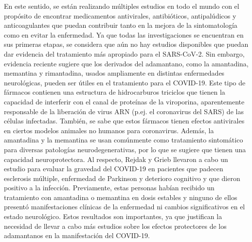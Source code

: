 \documentclass[12 pt]{article}
\begin{document}
En este sentido, se están realizando múltiples estudios en todo el mundo con el propósito de encontrar medicamentos antivirales, antibióticos, antipalúdicos y anticoagulantes que puedan contribuir tanto en la mejora de la sintomatología como en evitar la enfermedad. Ya que todas las investigaciones se encuentran en sus primeras etapas, se considera que aún no hay estudios disponibles que puedan dar evidencia del tratamiento más apropiado para el SARS-CoV-2. Sin embargo, evidencia reciente sugiere que los derivados del adamantano, como la amantadina, memantina y rimantadina, usados ampliamente en distintas enfermedades neurológicas, pueden ser útiles en el tratamiento para el COVID-19\citep{borra2020does}. Este tipo de fármacos contienen una estructura de hidrocarburos triciclos que tienen la capacidad de interferir con el canal de proteínas de la viroporina, aparentemente responsable de la liberación de virus ARN (p.ej. el coronavirus del SARS) de las células infectadas\citep{torres2007conductance}. También, se sabe que estos fármacos tienen efectos antivirales en ciertos modelos animales no humanos para coronavirus\citep{cimolai2020potentially}.  Además, la amantadina y la memantina se usan comúnmente como tratamiento sintomático para diversas patologías neurodegenerativas, por lo que se sugiere que tienen una capacidad neuroprotectora\citep{tipton2020response}. Al respecto, Rejdak y Grieb\citep{rejdak2020adamantanes} llevaron a cabo un estudio para evaluar la gravedad del COVID-19 en pacientes que padecen esclerosis múltiple, enfermedad de Parkinson y deterioro cognitivo y que dieron positivo a la infección. Previamente, estas personas habían recibido un tratamiento con amantadina o memantina en dosis estables y ninguno de ellos presentó manifestaciones clínicas de la enfermedad ni cambios significativos en el estado neurológico. Estos resultados son importantes, ya que justifican la necesidad de llevar a cabo más estudios sobre los efectos protectores de los adamantanos en la manifestación del COVID-19.\\\\
\end{document}
